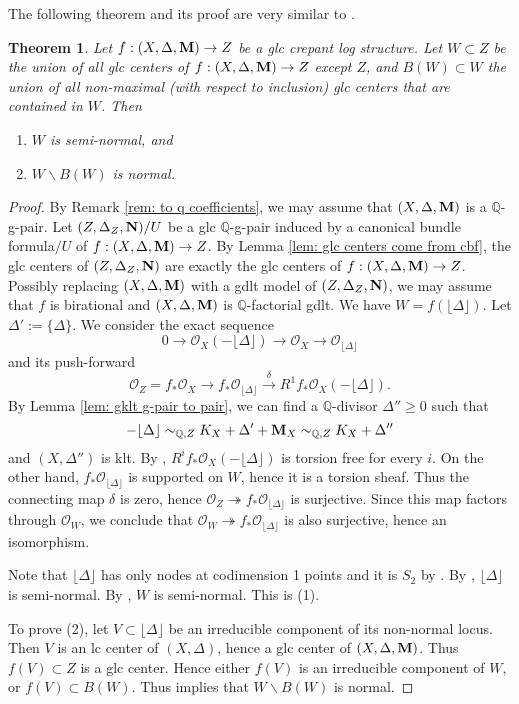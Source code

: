 \documentclass[11pt]{amsart}
\numberwithin{equation}{section}
\newcommand{\Mm}{{\bf{M}}}
\newcommand{\NN}{{\bf{N}}}
\newcommand{\Qq}{\mathbb{Q}}
\newcommand{\lf}{\lfloor}
\newcommand{\rf}{\rfloor}
\newcommand{\Oo}{\mathcal{O}}
\newtheorem{thm}{Theorem}[section]
\theoremstyle{definition}
\theoremstyle{definition}
\theoremstyle{definition}
\begin{document}
The following theorem and its proof are very similar to \cite[Theorem 4.32]{Kol13}.
\begin{thm}\label{thm: glc locus is semi-normal}
Let $f:(X,\Delta,\Mm)\to Z$ be a glc crepant log structure. Let $W\subset Z$ be the union of all glc centers of $f:(X,\Delta,\Mm)\to Z$ except $Z$, and $B(W)\subset W$ the union of all non-maximal (with respect to inclusion) glc centers that are contained in $W$. Then
\begin{enumerate}
    \item $W$ is semi-normal, and
    \item $W\backslash B(W)$ is normal.
\end{enumerate}
\end{thm}
\begin{proof}
By Remark \ref{rem: to q coefficients}, we may assume that $(X,\Delta,\Mm)$ is a $\Qq$-g-pair. Let $(Z,\Delta_Z,\NN)/U$ be a glc $\mathbb Q$-g-pair induced by a canonical bundle formula$/U$ of $f: (X,\Delta,\Mm)\rightarrow Z$. By Lemma \ref{lem: glc centers come from cbf}, the glc centers of $(Z,\Delta_Z,\NN)$ are exactly the glc centers of $f: (X,\Delta,\Mm)\rightarrow Z$. Possibly replacing $(X,\Delta,\Mm)$ with a gdlt model of $(Z,\Delta_Z,\NN)$, we may assume that $f$ is birational and $(X,\Delta,\Mm)$ is $\mathbb Q$-factorial gdlt. We have $W=f(\lf\Delta\rf)$. Let $\Delta':=\{\Delta\}$. We consider the exact sequence 
$$
0\to\Oo_X(-\lf\Delta\rf)\to\Oo_X\to\Oo_{\lf\Delta\rf}
$$
and its push-forward
$$
\Oo_Z=f_*\Oo_X\to f_*\Oo_{\lf\Delta\rf}\stackrel{\delta}{\longrightarrow}R^1f_*\Oo_X(-\lf\Delta\rf).
$$
By Lemma \ref{lem: gklt g-pair to pair}, we can find a $\Qq$-divisor $\Delta''\ge 0$ such that $$-\lf\Delta\rf\sim_{\Qq,Z}K_X+\Delta'+\Mm_X\sim_{\Qq,Z}K_X+\Delta''$$ and $(X,\Delta'')$ is klt. By \cite[Corollary 10.40]{Kol13}, $R^if_*\Oo_{X}(-\lf\Delta\rf)$ is torsion free for every $i$. On the other hand, $f_*\Oo_{\lf\Delta\rf}$ is supported on $W$, hence it is a torsion sheaf. Thus the connecting map $\delta$ is zero, hence $\Oo_Z\twoheadrightarrow f_*\Oo_{\lf\Delta\rf}$ is surjective. Since this map factors through $\Oo_W$, we conclude that $\Oo_W\twoheadrightarrow f_*\Oo_{\lf\Delta\rf}$ is also surjective, hence an isomorphism.



Note that $\lf\Delta\rf$ has only nodes at codimension 1 points and it is $S_2$ by \cite[Corollary 2.88]{Kol13}. By \cite[Lemma 10.14]{Kol13}, $\lf\Delta\rf$ is semi-normal. By \cite[Lemma 10.15]{Kol13}, $W$ is semi-normal. This is (1).

To prove (2), let $V\subset\lf\Delta\rf$ be an irreducible component of its non-normal locus. Then $V$ is an lc center of $(X, \Delta)$, hence a glc center of $(X,\Delta,\Mm)$. Thus $f(V)\subset Z$ is a glc center. Hence either $f(V)$ is an irreducible component of $W$, or $f(V)\subset B(W)$. Thus \cite[Complement 10.15.1]{Kol13} implies that $W \backslash B(W)$ is normal.
\end{proof}
\end{document}
